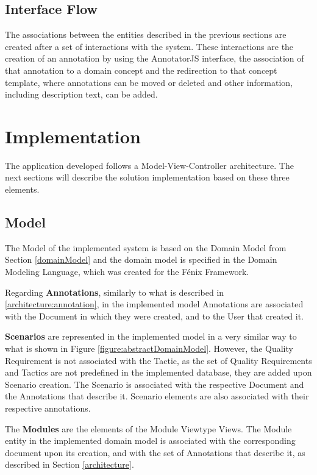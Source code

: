 \documentclass[conference]{IEEEtran}
\begin{document}
\subsection{Interface Flow}
\label{section:interfaceFlow}

The associations between the entities described in the previous sections are created after a set of interactions with the system. These interactions are the creation of an annotation by using the AnnotatorJS interface, the association of that annotation to a domain concept and the redirection to that concept template, where annotations can be moved or deleted and other information, including description text, can be added.

\section{Implementation}
\label{implementation}
The application developed follows a Model-View-Controller architecture. The next sections will describe the solution implementation based on these three elements.

\subsection{Model}
\label{implementation:model}
The Model of the implemented system is based on the Domain Model from Section \ref{domainModel} and the domain model is specified in the Domain Modeling Language, which was created for the F\'{e}nix Framework\cite{cachopo2006combining,cachopo2007development}.

Regarding \textbf{Annotations}, similarly to what is described in \ref{architecture:annotation}, in the implemented model Annotations are associated with the Document in which they were created, and to the User that created it.

\textbf{Scenarios} are represented in the implemented model in a very similar way to what is shown in Figure \ref{figure:abstractDomainModel}. However, the Quality Requirement is not associated with the Tactic, as the set of Quality Requirements and Tactics are not predefined in the implemented database, they are added upon Scenario creation. The Scenario is associated with the respective Document and the Annotations that describe it. Scenario elements are also associated with their respective annotations.

The \textbf{Modules} are the elements of the Module Viewtype Views. The Module entity in the implemented domain model is associated with the corresponding document upon its creation, and with the set of Annotations that describe it, as described in Section \ref{architecture}.
\end{document}
